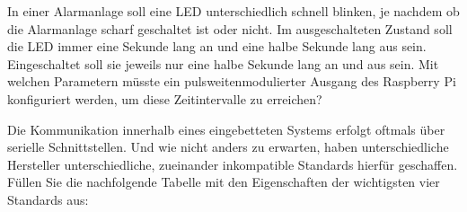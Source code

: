 \bigskip
\teilaufgabe
In einer Alarmanlage soll eine LED unterschiedlich schnell blinken, je nachdem
ob die Alarmanlage scharf geschaltet ist oder nicht. Im ausgeschalteten Zustand
soll die LED immer eine Sekunde lang an und eine halbe Sekunde lang aus sein.
Eingeschaltet soll sie jeweils nur eine halbe Sekunde lang an und aus sein.
Mit welchen Parametern müsste ein pulsweitenmodulierter Ausgang des Raspberry
Pi konfiguriert werden, um diese Zeitintervalle zu erreichen?

\teilaufgabe
Die Kommunikation innerhalb eines eingebetteten Systems erfolgt oftmals über
serielle Schnittstellen. Und wie nicht anders zu erwarten, haben unterschiedliche
Hersteller unterschiedliche, zueinander inkompatible Standards hierfür geschaffen.
Füllen Sie die nachfolgende Tabelle mit den Eigenschaften der wichtigsten vier
Standards aus:


